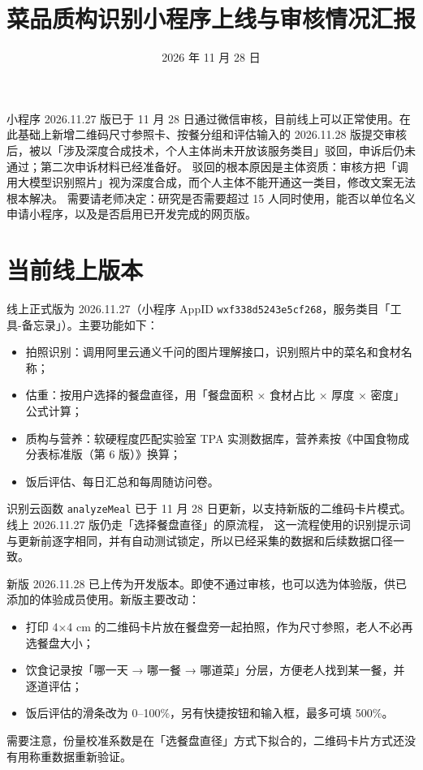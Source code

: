 \documentclass[11pt,a4paper,plain,CN,colored-proof=false,
  load-custom-latin-font-file=pku-font-latin.tex,
  load-custom-math-font-file=pku-font-math.tex,
  load-custom-cjk-font-file=pku-font-cjk.tex]{einfart}
\title{菜品质构识别小程序上线与审核情况汇报}
\author{}
\date{2026 年 11 月 28 日}
\begin{document}
\MakeReportTitle
\begin{notesabstract}
小程序 2026.11.27 版已于 11 月 28 日通过微信审核，目前线上可以正常使用。在此基础上新增二维码尺寸参照卡、按餐分组和评估输入的
2026.11.28 版提交审核后，被以「涉及深度合成技术，个人主体尚未开放该服务类目」驳回，申诉后仍未通过；第二次申诉材料已经准备好。
驳回的根本原因是主体资质：审核方把「调用大模型识别照片」视为深度合成，而个人主体不能开通这一类目，修改文案无法根本解决。
需要请老师决定：研究是否需要超过 15 人同时使用，能否以单位名义申请小程序，以及是否启用已开发完成的网页版。
\end{notesabstract}

\section{当前线上版本}

线上正式版为 2026.11.27（小程序 AppID \texttt{wxf338d5243e5cf268}，服务类目「工具-备忘录」）。主要功能如下：
\begin{itemize}
  \item 拍照识别：调用阿里云通义千问的图片理解接口，识别照片中的菜名和食材名称；
  \item 估重：按用户选择的餐盘直径，用「餐盘面积 × 食材占比 × 厚度 × 密度」公式计算；
  \item 质构与营养：软硬程度匹配实验室 TPA 实测数据库，营养素按《中国食物成分表标准版（第 6 版）》换算；
  \item 饭后评估、每日汇总和每周随访问卷。
\end{itemize}

识别云函数 \texttt{analyzeMeal} 已于 11 月 28 日更新，以支持新版的二维码卡片模式。线上 2026.11.27 版仍走「选择餐盘直径」的原流程，
这一流程使用的识别提示词与更新前逐字相同，并有自动测试锁定，所以已经采集的数据和后续数据口径一致。

新版 2026.11.28 已上传为开发版本。即使不通过审核，也可以选为体验版，供已添加的体验成员使用。新版主要改动：
\begin{itemize}
  \item 打印 4×4 cm 的二维码卡片放在餐盘旁一起拍照，作为尺寸参照，老人不必再选餐盘大小；
  \item 饮食记录按「哪一天 → 哪一餐 → 哪道菜」分层，方便老人找到某一餐，并逐道评估；
  \item 饭后评估的滑条改为 0–100\%，另有快捷按钮和输入框，最多可填 500\%。
\end{itemize}
需要注意，份量校准系数是在「选餐盘直径」方式下拟合的，二维码卡片方式还没有用称重数据重新验证。
\end{document}
